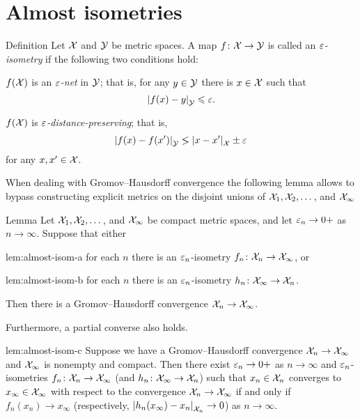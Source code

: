 \section{Almost isometries}\label{sec:Almost isometries}

\begin{thm}{Definition}
Let $\mathcal{X}$ and $\mathcal{Y}$ be metric spaces.
A map $f\colon\mathcal{X}\to\mathcal{Y}$
is called an \emph{$\varepsilon$-isometry}
if the following two conditions hold:

\begin{subthm}{}
$f(\mathcal{X})$ is an \emph{$\varepsilon$-net} in $\mathcal{Y}$; that is, for any $y\in \mathcal{Y}$ there is $x\in \mathcal{X}$ such that
\[|{f(x)}-{y}|_{\mathcal{Y}}^{{}}\leqslant\varepsilon.\]
\end{subthm}

\begin{subthm}{}
$f(\mathcal{X})$ is \emph{$\varepsilon$-distance-preserving}; that is,
\[\dist{f(x)}{f(x')}{\spc{Y}}\lg \dist{x}{x'}{\spc{X}}\pm\eps \]
for any $x,x'\in\mathcal{X}$.
\end{subthm}

\end{thm}

When dealing with Gromov--Hausdorff convergence the following lemma allows to bypass constructing explicit metrics on the disjoint unions of $\mathcal{X}_1,\mathcal{X}_2,\dots$, and $\mathcal{X}_\infty$

\begin{thm}{Lemma}\label{lem:almost-isom}
Let $\mathcal{X}_1,\mathcal{X}_2,\dots$, and $\mathcal{X}_\infty$ be compact metric spaces,
and let $\varepsilon_n\to0+$ as $n\to\infty$.
Suppose that either 
\begin{subthm}{lem:almost-isom-a}
for each $n$ there is an $\varepsilon_n$-isometry $f_n\colon\mathcal{X}_n\to\mathcal{X}_\infty$, or
\end{subthm}
\begin{subthm}{lem:almost-isom-b}
for each $n$ there is an $\varepsilon_n$-isometry $h_n\colon\mathcal{X}_\infty\to\mathcal{X}_n$.
\end{subthm}
Then there is a Gromov--Hausdorff convergence $\mathcal{X}_n\to \mathcal{X}_\infty$.

Furthermore, a partial converse also holds.

\begin{subthm}{lem:almost-isom-c}
Suppose we have a Gromov--Hausdorff convergence $\mathcal{X}_n\to \mathcal{X}_\infty$ and $\mathcal{X}_\infty$ is nonempty and compact.
Then there exist $\varepsilon_n\to0+$ as $n\to\infty$ and $\varepsilon_n$-isometries $f_n\colon\mathcal{X}_n\to\mathcal{X}_\infty$ (and $h_n\colon\mathcal{X}_\infty\to\mathcal{X}_n$)
such that $x_n\in \mathcal{X}_n$ converges to $x_\infty \in  \mathcal{X}_\infty$ with respect to the  convergence $\mathcal{X}_n\to \mathcal{X}_\infty$ if and only if $f_n(x_n)\to x_\infty$ (respectively, $|{h_n(x_\infty) }-{x_n}|_{\mathcal{X}_n}^{{}}\to 0$) as $n\to\infty$.
\end{subthm}
\end{thm}


